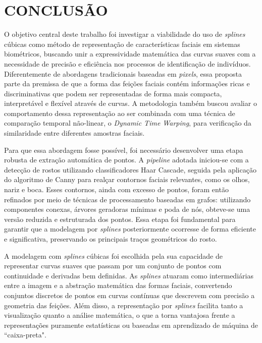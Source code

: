 \chapter{CONCLUSÃO} \label{cha:conclusao}

O objetivo central deste trabalho foi investigar a viabilidade do uso de \textit{splines} cúbicas como método de representação de características faciais em sistemas biométricos, buscando unir a expressividade matemática das curvas suaves com a necessidade de precisão e eficiência nos processos de identificação de indivíduos. Diferentemente de abordagens tradicionais baseadas em \textit{pixels}, essa proposta parte da premissa de que a forma das feições faciais contém informações ricas e discriminativas que podem ser representadas de forma mais compacta, interpretável e flexível através de curvas. A metodologia também buscou avaliar o comportamento dessa representação ao ser combinada com uma técnica de comparação temporal não-linear, o \textit{Dynamic Time Warping}, para verificação da similaridade entre diferentes amostras faciais.

Para que essa abordagem fosse possível, foi necessário desenvolver uma etapa robusta de extração automática de pontos. A \textit{pipeline} adotada iniciou-se com a detecção de rostos utilizando classificadores Haar Cascade, seguida pela aplicação do algoritmo de Canny para realçar contornos faciais relevantes, como os olhos, nariz e boca. Esses contornos, ainda com excesso de pontos, foram então refinados por meio de técnicas de processamento baseadas em grafos: utilizando componentes conexas, árvores geradoras mínimas e poda de nós, obteve-se uma versão reduzida e estruturada dos pontos. Essa etapa foi fundamental para garantir que a modelagem por \textit{splines} posteriormente ocorresse de forma eficiente e significativa, preservando os principais traços geométricos do rosto.

A modelagem com \textit{splines} cúbicas foi escolhida pela sua capacidade de representar curvas suaves que passam por um conjunto de pontos com continuidade e derivadas bem definidas. As \textit{splines} atuaram como intermediárias entre a imagem e a abstração matemática das formas faciais, convertendo conjuntos discretos de pontos em curvas contínuas que descrevem com precisão a geometria das feições. Além disso, a representação por \textit{splines} facilita tanto a visualização quanto a análise matemática, o que a torna vantajosa frente a representações puramente estatísticas ou baseadas em aprendizado de máquina de ``caixa-preta".



